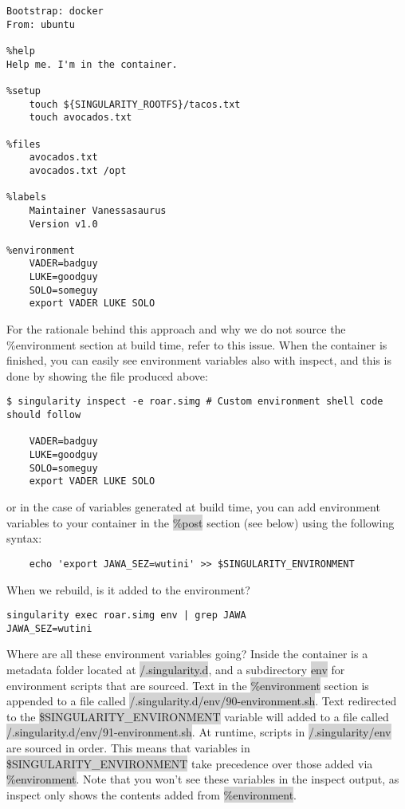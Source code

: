 \documentclass[a4paper]{article}
\begin{document}
\begin{lstlisting}[frame=single]  
Bootstrap: docker
From: ubuntu

%help
Help me. I'm in the container.

%setup
    touch ${SINGULARITY_ROOTFS}/tacos.txt
    touch avocados.txt

%files
    avocados.txt
    avocados.txt /opt    

%labels
    Maintainer Vanessasaurus
    Version v1.0

%environment
    VADER=badguy
    LUKE=goodguy
    SOLO=someguy
    export VADER LUKE SOLO
\end{lstlisting}

For the rationale behind this approach and why we do not source the \%environment section at build time, refer to this issue. When the container is finished, you can easily see environment variables also with inspect, and this is done by showing the file produced above:

\begin{lstlisting}[frame=single]  
$ singularity inspect -e roar.simg # Custom environment shell code should follow

    VADER=badguy
    LUKE=goodguy
    SOLO=someguy
    export VADER LUKE SOLO
\end{lstlisting}
    
or in the case of variables generated at build time, you can add environment variables to your container in the \colorbox{lightgray}{\%post} section (see below) using the following syntax: 

\begin{lstlisting}[frame=single] 
%post
    echo 'export JAWA_SEZ=wutini' >> $SINGULARITY_ENVIRONMENT 
\end{lstlisting}

    When we rebuild, is it added to the environment?
    
\begin{lstlisting}[frame=single] 
singularity exec roar.simg env | grep JAWA
JAWA_SEZ=wutini
\end{lstlisting}

Where are all these environment variables going? Inside the container is a metadata folder located at \colorbox{lightgray}{/.singularity.d}, and a subdirectory \colorbox{lightgray}{env} for environment scripts that are sourced. Text in the \colorbox{lightgray}{\%environment} section is appended to a file called \colorbox{lightgray}{/.singularity.d/env/90-environment.sh}. Text redirected to the \colorbox{lightgray}{\$SINGULARITY\_ENVIRONMENT} variable will added to a file called \colorbox{lightgray}{/.singularity.d/env/91-environment.sh}. At runtime, scripts in \colorbox{lightgray}{/.singularity/env} are sourced in order. This means that variables in \colorbox{lightgray}{\$SINGULARITY\_ENVIRONMENT} take precedence over those added via \colorbox{lightgray}{\%environment}. Note that you won’t see these variables in the inspect output, as inspect only shows the contents added from \colorbox{lightgray}{\%environment}.\\[0.1in]
\end{document}
